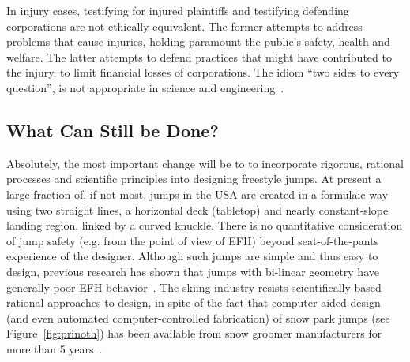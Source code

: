 \documentclass[smallextended]{svjour3}       %
\begin{document}
In injury cases, testifying for injured plaintiffs and testifying defending
corporations are not ethically equivalent. The former attempts to address
problems that cause injuries, holding paramount the public's safety, health and
welfare. The latter attempts to defend practices that might have contributed to
the injury, to limit financial losses of corporations. The idiom ``two
sides to every question'', is not appropriate in science and
engineering~\cite[page 268]{Oreskes2010}.





\subsection{What Can Still be Done?}
\label{sec:action}
Absolutely, the most important change will be to to incorporate rigorous, rational  processes and scientific principles into designing freestyle jumps. At present a large fraction of, if not most, jumps in the USA are created in a formulaic way using two straight lines, a horizontal deck (tabletop) and nearly constant-slope landing region, linked by a curved knuckle. There is no quantitative consideration of jump safety (e.g. from the point of view of EFH) beyond seat-of-the-pants experience of the designer. Although such jumps are simple and thus easy to design, previous research has shown that jumps with bi-linear geometry have generally poor EFH behavior~\cite{Swedberg2012}. The skiing industry resists scientifically-based rational approaches to design, in spite of the fact that computer aided design (and even automated computer-controlled fabrication) of snow park jumps (see Figure~\ref{fig:prinoth}) has been available from snow groomer manufacturers for more than 5 years~\cite{Muigg2019}.
\end{document}

